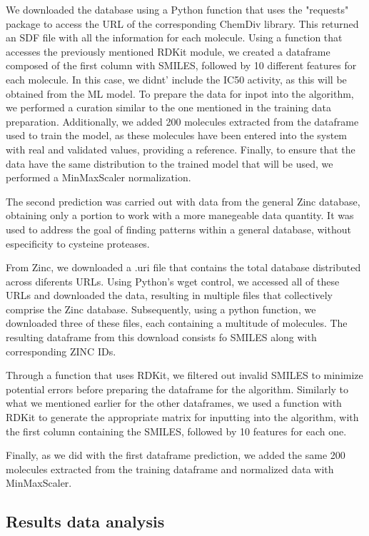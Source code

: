 \documentclass[final,times,twocolumn,article]{elsarticle}
\begin{document}
We downloaded the database using a Python function that uses the "requests" package to access the URL of the corresponding ChemDiv library. This returned an SDF file with all the information for each molecule. Using a function that accesses the previously mentioned RDKit module, we created a dataframe composed of the first column with SMILES, followed by 10 different features for each molecule. In this case, we didnt' include the IC50 activity, as this will be obtained from the ML model. 
To prepare the data for inpot into the algorithm, we performed a curation similar to the one mentioned in the training data preparation. Additionally, we added 200 molecules extracted from the dataframe used to train the model, as these molecules have been entered into the system with real and validated values, providing a reference. Finally, to ensure that the data have the same distribution to the trained model that will be used, we performed a MinMaxScaler normalization. 

The second prediction was carried out with data from the general Zinc database, obtaining only a portion to work with a more manegeable data quantity. It was used to address the goal of finding patterns within a general database, without especificity to cysteine proteases. 

From Zinc, we downloaded a .uri file that contains the total database distributed across diferents URLs. Using Python's wget control, we accessed all of these URLs and downloaded the data, resulting in multiple files that collectively comprise the Zinc database. Subsequently, using a python function, we downloaded three of these files, each containing a multitude of molecules. The resulting dataframe from this download consists fo SMILES along with corresponding ZINC IDs. 

Through a function that uses RDKit, we filtered out invalid SMILES to minimize potential errors before preparing the dataframe for the algorithm. Similarly to what we mentioned earlier for the other dataframes, we used a function with RDKit to generate the appropriate matrix for inputting into the algorithm, with the first column containing the SMILES, followed by 10 features for each one. 

Finally, as we did with the first dataframe prediction, we added the same 200 molecules extracted from the training dataframe and normalized data with MinMaxScaler. 

\subsection{Results data analysis}
\end{document}
